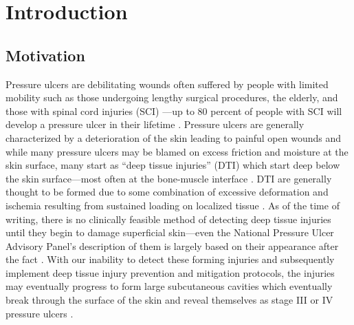 \chapter{Introduction}
	\section{Motivation}
		Pressure ulcers are debilitating wounds often suffered by people with limited mobility such as those undergoing lengthy surgical procedures, the elderly, and those with spinal cord injuries (SCI) \cite{allman95}---up to 80 percent of people with SCI will develop a pressure ulcer in their lifetime \cite{salzberg96}. Pressure ulcers are generally characterized by a deterioration of the skin leading to painful open wounds and while many pressure ulcers may be blamed on excess friction and moisture at the skin surface, many start as ``deep tissue injuries'' (DTI) which start deep below the skin surface---most often at the bone-muscle interface \cite{kanno09}. DTI are generally thought to be formed due to some combination of excessive deformation and ischemia resulting from sustained loading on localized tissue \cite{stekelenburg08, gefen05, loerakker11}. As of the time of writing, there is no clinically feasible method of detecting deep tissue injuries until they begin to damage superficial skin---even the National Pressure Ulcer Advisory Panel's description of them is largely based on their appearance after the fact \cite{npuap07}. With our inability to detect these forming injuries and subsequently implement deep tissue injury prevention and mitigation protocols, the injuries may eventually progress to form large subcutaneous cavities which eventually break through the surface of the skin and reveal themselves as stage III or IV pressure ulcers \cite{bouten03,oomens10}.

